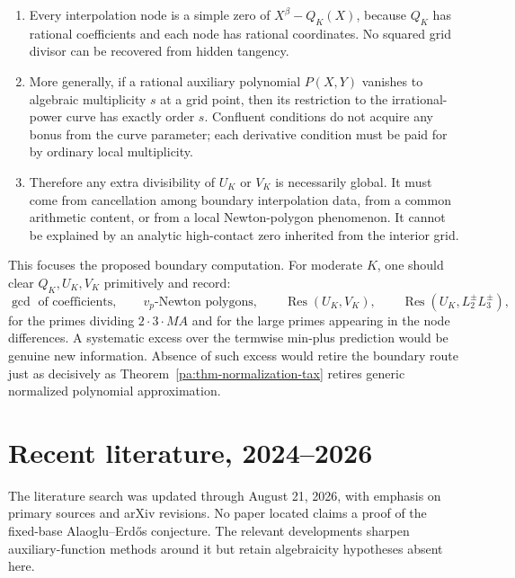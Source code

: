 \documentclass[11pt,oneside]{article}
\theoremstyle{definition}
\theoremstyle{remark}
\begin{document}
\begin{enumerate}
\item Every interpolation node is a simple zero of
\(X^{\beta}-Q_K(X)\), because \(Q_K\) has rational coefficients and each node has rational
coordinates.  No squared grid divisor can be recovered from hidden tangency.

\item More generally, if a rational auxiliary polynomial \(P(X,Y)\) vanishes to algebraic
multiplicity \(s\) at a grid point, then its restriction to the irrational-power curve has
exactly order \(s\).  Confluent conditions do not acquire any bonus from the curve parameter;
each derivative condition must be paid for by ordinary local multiplicity.

\item Therefore any extra divisibility of \(U_K\) or \(V_K\) is necessarily global.  It must
come from cancellation among boundary interpolation data, from a common arithmetic content,
or from a local Newton-polygon phenomenon.  It cannot be explained by an analytic
high-contact zero inherited from the interior grid.
\end{enumerate}

This focuses the proposed boundary computation.  For moderate \(K\), one should clear
\(Q_K,U_K,V_K\) primitively and record:
\begin{equation}
 \gcd\text{ of coefficients},\qquad
 v_p\text{-Newton polygons},\qquad
 \operatorname{Res}(U_K,V_K),
 \qquad
 \operatorname{Res}(U_K,L_2^\pm L_3^\pm),
 \label{pa:eq-boundary-audit}
\end{equation}
for the primes dividing \(2\cdot3\cdot MA\) and for the large primes appearing in the node
differences.  A systematic excess over the termwise min-plus prediction would be genuine new
information.  Absence of such excess would retire the boundary route just as decisively as
Theorem~\ref{pa:thm-normalization-tax} retires generic normalized polynomial approximation.

\section{Recent literature, 2024--2026}
\label{pa:sec-literature}

The literature search was updated through August 21, 2026, with emphasis on primary sources
and arXiv revisions.  No paper located claims a proof of the fixed-base Alaoglu--Erd\H{o}s
conjecture.  The relevant developments sharpen auxiliary-function methods around it but retain
algebraicity hypotheses absent here.
\end{document}
